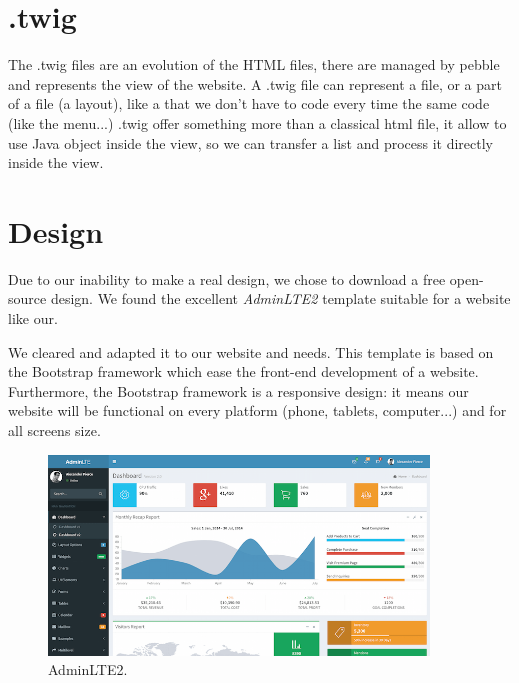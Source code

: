 \section{.twig}

The .twig files are an evolution of the HTML files, there are managed by pebble and represents the view of the website.
A .twig file can represent a file, or a part of a file (a layout), like a that we don't have to code every time the same code (like the menu...)
.twig offer something more than a classical html file, it allow to use Java object inside the view, so we can transfer a list and process it directly inside the view.


\section{Design}

Due to our inability to make a real design, we chose to download a free open-source design. We found the excellent \textit{AdminLTE2} template suitable for a website like our.
\newline

We cleared and adapted it to our website and needs.
This template is based on the Bootstrap framework which ease the front-end development of a website. Furthermore, the Bootstrap framework is a responsive design: it means our website will be functional on every platform (phone, tablets, computer...) and for all screens size.

\begin{figure}[!ht]
  \caption{AdminLTE2.}
  \centering
    \includegraphics[width=0.9\textwidth]{img/design.png}
\end{figure}







